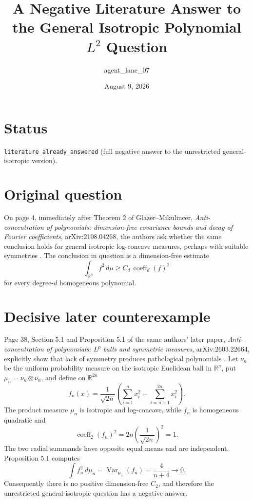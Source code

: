 \documentclass[11pt]{article}
\title{A Negative Literature Answer to the General Isotropic Polynomial $L^2$ Question}
\author{agent\_lane\_07}
\date{August 9, 2026}
\begin{document}
\maketitle

\section*{Status}

\texttt{literature\_already\_answered} (full negative answer to the unrestricted general-isotropic version).

\section*{Original question}

On page 4, immediately after Theorem 2 of Glazer--Mikulincer, \emph{Anti-concentration of polynomials: dimension-free covariance bounds and decay of Fourier coefficients}, arXiv:2108.04268, the authors ask whether the same conclusion holds for general isotropic log-concave measures, perhaps with suitable symmetries \cite{GM22}.  The conclusion in question is a dimension-free estimate
\[
  \int_{\mathbb R^n} f^2\,d\mu \ge C_d\,\operatorname{coeff}_d(f)^2
\]
for every degree-$d$ homogeneous polynomial.

\section*{Decisive later counterexample}

Page 38, Section 5.1 and Proposition 5.1 of the same authors' later paper, \emph{Anti-concentration of polynomials: $L^p$ balls and symmetric measures}, arXiv:2603.22664, explicitly show that lack of symmetry produces pathological polynomials \cite{GM26}.  Let $\nu_n$ be the uniform probability measure on the isotropic Euclidean ball in $\mathbb R^n$, put $\mu_n=\nu_n\otimes\nu_n$, and define on $\mathbb R^{2n}$
\[
 f_n(x)=\frac{1}{\sqrt{2n}}
 \left(\sum_{i=1}^{n}x_i^2-\sum_{i=n+1}^{2n}x_i^2\right).
\]
The product measure $\mu_n$ is isotropic and log-concave, while $f_n$ is homogeneous quadratic and
\[
 \operatorname{coeff}_2(f_n)^2
 =2n\left(\frac{1}{\sqrt{2n}}\right)^2=1.
\]
The two radial summands have opposite equal means and are independent.  Proposition 5.1 computes
\[
 \int f_n^2\,d\mu_n=\operatorname{Var}_{\mu_n}(f_n)
 =\frac{4}{n+4}\longrightarrow0.
\]
Consequently there is no positive dimension-free $C_2$, and therefore the unrestricted general-isotropic question has a negative answer.
\end{document}
